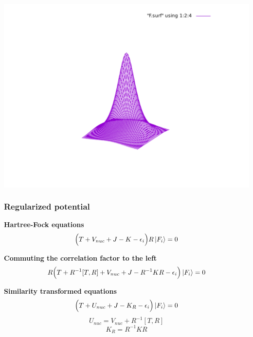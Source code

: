 \begin{frame}
\includegraphics[scale=0.35, viewport = 175 90 430 400, clip]{figures/F.pdf}\\
\end{frame}

\begin{frame}
\frametitle{Regularized potential}
\scriptsize
\centering

\textbf{Hartree-Fock equations}
\begin{equation}
    \nonumber
    \Big(T + V_{nuc} + J - K - \epsilon_i\Big)R\ket{F_i} = 0
\end{equation}

\vspace{5mm}

\pause
\textbf{Commuting the correlation factor to the left}
\begin{equation}
    \nonumber
    R\Big(T + R^{-1}[T,R] + V_{nuc} + J - R^{-1}KR - \epsilon_i\Big)\ket{F_i} = 0
\end{equation}

\vspace{5mm}

\pause
\textbf{Similarity transformed equations}
\begin{equation}
    \nonumber
    \Big(T + U_{nuc} + J - K_R - \epsilon_i\Big)\ket{F_i} = 0
\end{equation}
\begin{equation}
    \nonumber
    U_{nuc} = V_{nuc} + R^{-1}[T,R]
\end{equation}
\begin{equation}
    \nonumber
    K_R = R^{-1}KR
\end{equation}

\end{frame}

